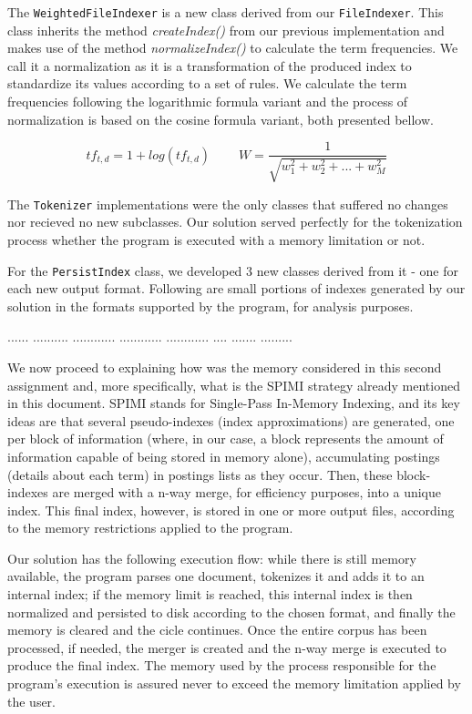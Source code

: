 \documentclass[12pt]{article}
\begin{document}
The \texttt{WeightedFileIndexer} is a new class derived from our 
\texttt{FileIndexer}.
This class inherits the method \textit{createIndex()} from our previous 
implementation and makes use of the method \textit{normalizeIndex()} to calculate 
the term frequencies. 
We call it a normalization as it is a transformation of the produced index to
standardize its values according to a set of rules.
We calculate the term frequencies following the logarithmic formula variant and 
the process of normalization is based on the cosine formula variant, both 
presented bellow.

\begin{equation*}
tf_{t,d} = 1 + log(tf_{t,d}) \>\>\>\>\>
\>\>\>\>\> W = \frac{1}{\sqrt{w_1^2 + w_2^2 + ... + w_M^2}}
\end{equation*}

The \texttt{Tokenizer} implementations were the only classes that suffered no
changes nor recieved no new subclasses. 
Our solution served perfectly for the tokenization process whether the program 
is executed with a memory limitation or not.

For the \texttt{PersistIndex} class, we developed 3 new classes derived from 
it - one for each new output format. 
Following are small portions of indexes generated by our solution in the formats
supported by the program, for analysis purposes.

...... .......... ............ ............ ............ .... ....... .........

We now proceed to explaining how was the memory considered in this second 
assignment and, more specifically, what is the SPIMI strategy already 
mentioned in this document.
SPIMI stands for Single-Pass In-Memory Indexing, and its key ideas are 
that several pseudo-indexes (index approximations) are generated, one per 
block of information (where, in our case, a block represents the amount 
of information capable of being stored in memory alone), accumulating 
postings (details about each term) in postings lists as they occur. 
Then, these block-indexes are merged with a n-way merge, for efficiency 
purposes, into a unique index.
This final index, however, is stored in one or more output files, 
according to the memory restrictions applied to the program.

Our solution has the following execution flow: while there is still memory 
available, the program parses one document, tokenizes it and adds it to an
internal index; if the memory limit is reached, this internal index is then 
normalized and persisted to disk according to the chosen format, and finally 
the memory is cleared and the cicle continues.
Once the entire corpus has been processed, if needed, the merger is created 
and the n-way merge is executed to produce the final index. 
The memory used by the process responsible for the program's execution is 
assured never to exceed the memory limitation applied by the user.
\end{document}
